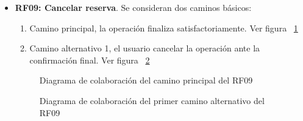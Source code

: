 \begin{itemize}
	\FloatBarrier
	\item \textbf{RF09: Cancelar reserva}. Se consideran dos caminos básicos: 
	\begin{enumerate}
		\item Camino principal, la operación finaliza satisfactoriamente. Ver figura ~\ref{fig:diagramaColaboracion_RF09_1}
		\item Camino alternativo 1, el usuario cancelar la operación ante la confirmación final. Ver figura ~\ref{fig:diagramaColaboracion_RF09_2}
	\end{enumerate}
	\begin{figure} [!htb]
		\centering
		\caption{Diagrama de colaboración del camino principal del RF09}
		\label{fig:diagramaColaboracion_RF09_1}
	\end{figure}
	\begin{figure} [!htb]
		\centering
		\caption{Diagrama de colaboración del primer camino alternativo del RF09}
		\label{fig:diagramaColaboracion_RF09_2}
	\end{figure}
	

\end{itemize}
